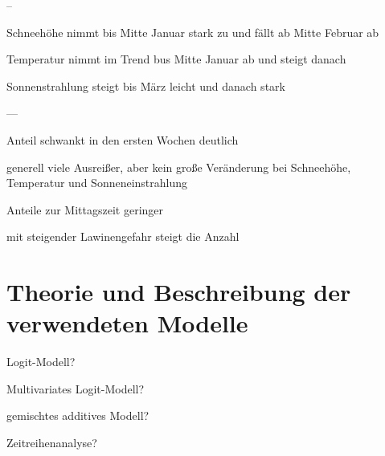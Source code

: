 \documentclass[11pt,a4paper]{report}
\begin{document}
--

Schneehöhe nimmt bis Mitte Januar stark zu und fällt ab Mitte Februar ab

Temperatur nimmt im Trend bus Mitte Januar ab und steigt danach
 
Sonnenstrahlung steigt bis März leicht und danach stark


---


Anteil schwankt in den ersten Wochen deutlich

generell viele Ausreißer, aber kein große Veränderung bei Schneehöhe, Temperatur und Sonneneinstrahlung

Anteile zur Mittagszeit geringer

mit steigender Lawinengefahr steigt die Anzahl

\chapter{Theorie und Beschreibung der verwendeten Modelle}

Logit-Modell?

Multivariates Logit-Modell?

gemischtes additives Modell?

Zeitreihenanalyse?
	
	
\end{document}
